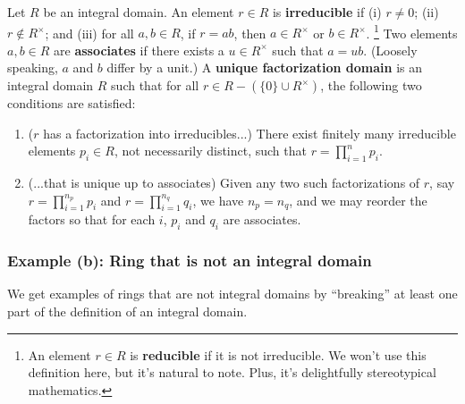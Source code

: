 \documentclass[oneside, english, 11pt]{article}
\newcommand{\fontDefWord}[1]{\textbf{#1}}
\renewcommand{\setminus}{-}
\begin{document}
{Let $R$ be an integral domain. An element $r \in R$ is \fontDefWord{irreducible} if (i) $r \neq 0$; (ii) $r \notin R^{\times}$; and (iii) for all $a, b \in R$, if $r = a b$, then $a \in R^{\times}$ or $b \in R^{\times}$.%
\footnote{An element $r \in R$ is \fontDefWord{reducible} if it is not irreducible. We won't use this definition here, but it's natural to note. Plus, it's delightfully stereotypical mathematics.} %
Two elements $a, b \in R$ are \fontDefWord{associates} if there exists a $u \in R^{\times}$ such that $a = u b$. (Loosely speaking, $a$ and $b$ differ by a unit.) A \fontDefWord{unique factorization domain} is an integral domain $R$ such that for all $r \in R \setminus (\{0\} \cup R^{\times})$, the following two conditions are satisfied:
\begin{enumerate}[label=(\roman*)]
\item ($r$ has a factorization into irreducibles...) There exist finitely many irreducible elements $p_{i} \in R$, not necessarily distinct, such that $r = \prod_{i = 1}^{n} p_{i}$.
\item (...that is unique up to associates) Given any two such factorizations of $r$, say $r = \prod_{i = 1}^{n_{p}} p_{i}$ and $r = \prod_{i = 1}^{n_{q}} q_{i}$, we have $n_{p} = n_{q}$, and we may reorder the factors so that for each $i$, $p_{i}$ and $q_{i}$ are associates.
\end{enumerate}



\subsubsection*{Example (b): Ring that is not an integral domain}

We get examples of rings that are not integral domains by ``breaking'' at least one part of the definition of an integral domain.

}
\end{document}
